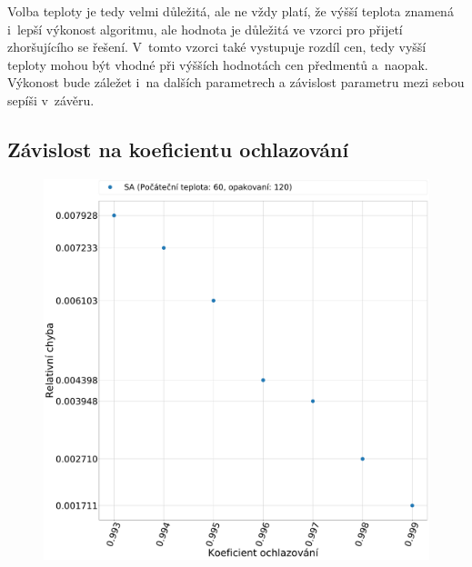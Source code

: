 \documentclass[11pt]{article}
\begin{document}
Volba teploty je tedy velmi důležitá, ale ne vždy platí, že výšší teplota znamená i~lepší výkonost algoritmu, ale hodnota je důležitá ve vzorci pro přijetí zhoršujícího se řešení. V~tomto vzorci také vystupuje rozdíl cen, tedy vyšší teploty mohou být vhodné při výšších hodnotách cen předmentů a~naopak. Výkonost bude záležet i~na dalších parametrech a závislost parametru mezi sebou sepíši v~závěru.

\subsection{Závislost na koeficientu ochlazování}
\begin{figure}
	\centering
    \begin{minipage}[c]{0.42\textwidth}
        \centering\includegraphics[width=\textwidth]{img/KE.pdf} 
    \end{minipage}
    \begin{minipage}[c]{0.42\textwidth}

\end{minipage}
\end{figure}
\end{document}
